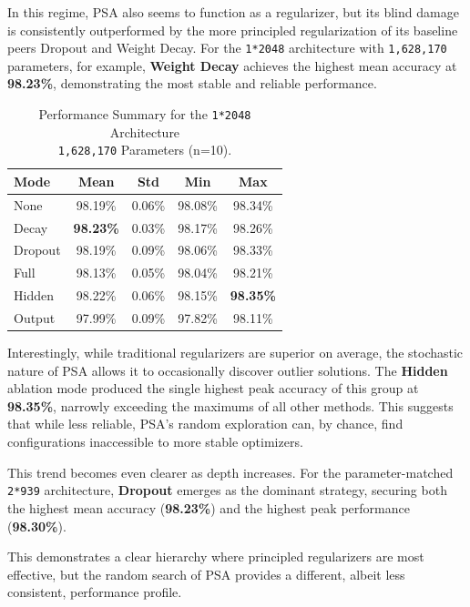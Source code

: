 \documentclass[conference]{IEEEtran}
\begin{document}
In this regime, PSA also seems to function as a regularizer, but its blind damage is consistently outperformed by the more principled regularization of its baseline peers Dropout and Weight Decay. For the \texttt{1*2048} architecture with \texttt{1,628,170} parameters, for example, \textbf{Weight Decay} achieves the highest mean accuracy at \textbf{98.23\%}, demonstrating the most stable and reliable performance.

\begin{table}[h!]
\centering
\caption{Performance Summary for the \texttt{1*2048} Architecture\\ \texttt{1,628,170} Parameters (n=10).}
\label{tab:1x2048_results}
\begin{tabular}{lcccc}
\toprule
\textbf{Mode} & \textbf{Mean} & \textbf{Std} & \textbf{Min} & \textbf{Max} \\
\midrule
None    & 98.19\% & 0.06\% & 98.08\% & 98.34\% \\
Decay   & \textbf{98.23\%} & 0.03\% & 98.17\% & 98.26\% \\
Dropout & 98.19\% & 0.09\% & 98.06\% & 98.33\% \\
Full    & 98.13\% & 0.05\% & 98.04\% & 98.21\% \\
Hidden  & 98.22\% & 0.06\% & 98.15\% & \textbf{98.35\%} \\
Output  & 97.99\% & 0.09\% & 97.82\% & 98.11\% \\
\bottomrule
\end{tabular}
\end{table}

Interestingly, while traditional regularizers are superior on average, the stochastic nature of PSA allows it to occasionally discover outlier solutions. The \textbf{Hidden} ablation mode produced the single highest peak accuracy of this group at \textbf{98.35\%}, narrowly exceeding the maximums of all other methods. This suggests that while less reliable, PSA's random exploration can, by chance, find configurations inaccessible to more stable optimizers.

This trend becomes even clearer as depth increases. For the parameter-matched \texttt{2*939} architecture, \textbf{Dropout} emerges as the dominant strategy, securing both the highest mean accuracy (\textbf{98.23\%}) and the highest peak performance (\textbf{98.30\%}).

This demonstrates a clear hierarchy where principled regularizers are most effective, but the random search of PSA provides a different, albeit less consistent, performance profile.
\end{document}
